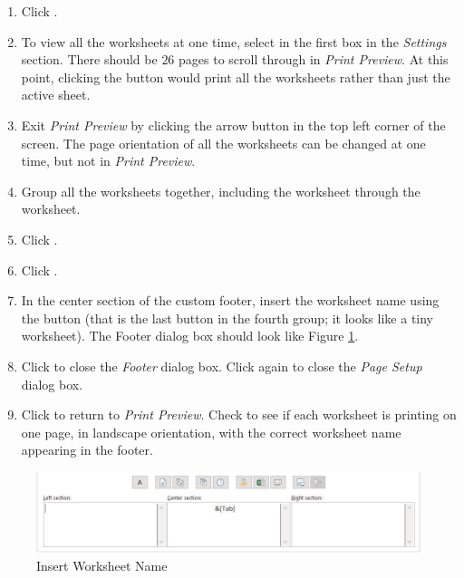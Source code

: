 \begin{enumbox}
	\begin{enumerate}
		\item Click .
		\item To view all the worksheets at one time, select  in the first box in the \textit{Settings} section. There should be $ 26 $ pages to scroll through in \textit{Print Preview}. At this point, clicking the  button would print all the worksheets rather than just the active sheet.
		\item Exit \textit{Print Preview} by clicking the arrow button in the top left corner of the screen. The page orientation of all the worksheets can be changed at one time, but not in \textit{Print Preview}.
		\item Group all the worksheets together, including the  worksheet through the  worksheet.
		\item Click .
		\item Click .
		\item In the center section of the custom footer, insert the worksheet name using the  button (that is the last button in the fourth group; it looks like a tiny worksheet). The Footer dialog box should look like Figure \ref{06:fig15}.
		\item Click  to close the \textit{Footer} dialog box. Click  again to close the \textit{Page Setup} dialog box.
		\item Click  to return to \textit{Print Preview}. Check to see if each worksheet is printing on one page, in landscape orientation, with the correct worksheet name appearing in the footer.
	\end{enumerate}
\end{enumbox}
	
\begin{figure}[H]
	\centering
	\includegraphics[width=\maxwidth{.95\linewidth}]{gfx/ch06_fig15}
	\caption{Insert Worksheet Name}
	\label{06:fig15}
\end{figure}

